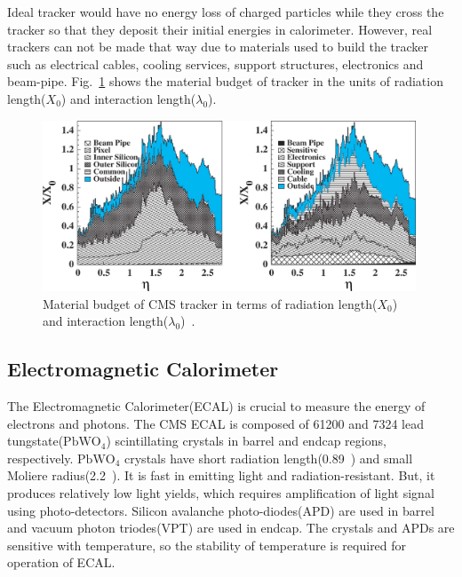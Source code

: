 Ideal tracker would have no energy loss of charged particles 
while they cross the tracker so that they deposit their initial 
energies in calorimeter. However, real trackers can not be made 
that way due to materials used to build the tracker such as 
electrical cables, cooling services, support structures, 
electronics and beam-pipe. Fig.~\ref{fig:trackermaterial} shows 
the material budget of tracker in the units of radiation length($X_0$) 
and interaction length($\lambda_0$). 
%
\begin{figure}[ht!] 
\vspace{1cm}
\centering 
\includegraphics[width=0.99\textwidth]{figures/trackermaterial.jpeg}
\caption{Material budget of CMS tracker in terms of radiation length($X_0$)
and interaction length($\lambda_0$)~\cite{Abbaneo2004331}.} 
\label{fig:trackermaterial} 
\end{figure} 



\subsection{Electromagnetic Calorimeter} 

The Electromagnetic Calorimeter(ECAL) is crucial to measure the energy 
of electrons and photons. The CMS ECAL is composed of 61200 and 7324 
lead tungstate($\textrm{PbWO}_4$) scintillating crystals in barrel and 
endcap regions, respectively. $\textrm{PbWO}_4$ crystals have short 
radiation length(0.89~\cm) and small Moliere radius(2.2~\cm). 
It is fast in emitting light and radiation-resistant. 
But, it produces relatively low light yields, which requires amplification 
of light signal using photo-detectors. Silicon avalanche photo-diodes(APD)
are used in barrel and vacuum photon triodes(VPT) are used in endcap.
The crystals and APDs are sensitive with temperature, so the stability
of temperature is required for operation of ECAL. 

